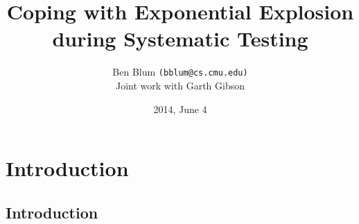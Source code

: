 \documentclass[xcolor=dvipsnames]{beamer}
\title[Landslide]{{\bf Coping with Exponential Explosion \\ during Systematic Testing}}
\author[Ben Blum]{Ben Blum \texttt{(bblum@cs.cmu.edu)} \\ {\small Joint work with Garth Gibson}}
\institute[CMU]{Carnegie Mellon University}
\date[]{2014, June 4}
\begin{document}
\normalem
\begin{frame}
	\titlepage
\end{frame}


\newcommand\linegap{\vspace{0.2in}}
\newcommand\breakslide[1]{\begin{frame}{} \begin{center} {\Large #1} \end{center} \end{frame}}

\section{Introduction}


\subsection{Introduction}
\end{document}
